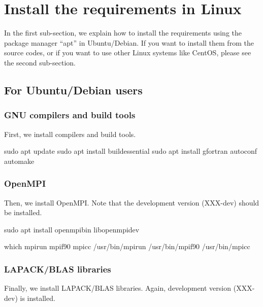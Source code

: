 \documentclass[a4paper,11pt,oneside,english]{sphinxmanual}
\begin{document}
\section{Install the requirements in Linux}
\label{\detokenize{98_Appendix:install-the-requirements-in-linux}}
In the first sub-section, we explain how to install the requirements
using the package manager “apt” in Ubuntu/Debian.
If you want to install them from the source codes,
or if you want to use other Linux systems like CentOS,
please see the second sub-section.


\subsection{For Ubuntu/Debian users}
\label{\detokenize{98_Appendix:for-ubuntu-debian-users}}

\subsubsection{GNU compilers and build tools}
\label{\detokenize{98_Appendix:gnu-compilers-and-build-tools}}
First, we install compilers and build tools.

\begin{sphinxVerbatim}[commandchars=\\\{\}]
\PYGZdl{} sudo apt update
\PYGZdl{} sudo apt install build\PYGZhy{}essential
\PYGZdl{} sudo apt install gfortran autoconf automake
\end{sphinxVerbatim}


\subsubsection{OpenMPI}
\label{\detokenize{98_Appendix:openmpi}}
Then, we install OpenMPI. Note that the development version (XXX-dev) should be installed.

\begin{sphinxVerbatim}[commandchars=\\\{\}]
\PYGZdl{} sudo apt install openmpi\PYGZhy{}bin libopenmpi\PYGZhy{}dev

\PYGZdl{} which mpirun mpif90 mpicc
/usr/bin/mpirun
/usr/bin/mpif90
/usr/bin/mpicc
\end{sphinxVerbatim}


\subsubsection{LAPACK/BLAS libraries}
\label{\detokenize{98_Appendix:lapack-blas-libraries}}
Finally, we install LAPACK/BLAS libraries. Again, development version (XXX-dev) is installed.
\end{document}
